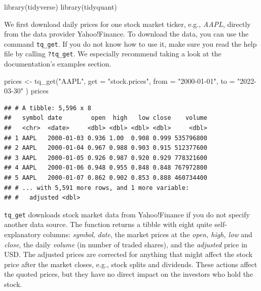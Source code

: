 \documentclass[
]{book}
\newenvironment{Shaded}{\begin{snugshade}}{\end{snugshade}}
\newcommand{\AttributeTok}[1]{\textcolor[rgb]{0.61,0.61,0.61}{#1}}
\newcommand{\FunctionTok}[1]{\textcolor[rgb]{0,0,0}{#1}}
\newcommand{\NormalTok}[1]{#1}
\newcommand{\OtherTok}[1]{\textcolor[rgb]{0.37,0.37,0.37}{#1}}
\newcommand{\StringTok}[1]{\textcolor[rgb]{0.5,0.5,0.5}{#1}}
\begin{document}
\begin{Shaded}
\begin{Highlighting}[]
\FunctionTok{library}\NormalTok{(tidyverse)}
\FunctionTok{library}\NormalTok{(tidyquant)}
\end{Highlighting}
\end{Shaded}

We first download daily prices for one stock market ticker, e.g., \emph{AAPL}, directly from the data provider Yahoo!Finance.
To download the data, you can use the command \texttt{tq\_get}. If you do not know how to use it, make sure you read the help file by calling \texttt{?tq\_get}.
We especially recommend taking a look at the documentation's examples section.

\begin{Shaded}
\begin{Highlighting}[]
\NormalTok{prices }\OtherTok{\textless{}{-}} \FunctionTok{tq\_get}\NormalTok{(}\StringTok{"AAPL"}\NormalTok{,}
  \AttributeTok{get =} \StringTok{"stock.prices"}\NormalTok{,}
  \AttributeTok{from =} \StringTok{"2000{-}01{-}01"}\NormalTok{,}
  \AttributeTok{to =} \StringTok{"2022{-}03{-}30"}
\NormalTok{)}
\NormalTok{prices}
\end{Highlighting}
\end{Shaded}

\begin{verbatim}
## # A tibble: 5,596 x 8
##   symbol date        open  high   low close    volume
##   <chr>  <date>     <dbl> <dbl> <dbl> <dbl>     <dbl>
## 1 AAPL   2000-01-03 0.936 1.00  0.908 0.999 535796800
## 2 AAPL   2000-01-04 0.967 0.988 0.903 0.915 512377600
## 3 AAPL   2000-01-05 0.926 0.987 0.920 0.929 778321600
## 4 AAPL   2000-01-06 0.948 0.955 0.848 0.848 767972800
## 5 AAPL   2000-01-07 0.862 0.902 0.853 0.888 460734400
## # ... with 5,591 more rows, and 1 more variable:
## #   adjusted <dbl>
\end{verbatim}

\texttt{tq\_get} downloads stock market data from Yahoo!Finance if you do not specify another data source. The function returns a tibble with eight quite self-explanatory columns: \emph{symbol}, \emph{date}, the market prices at the \emph{open, high, low} and \emph{close}, the daily \emph{volume} (in number of traded shares), and the \emph{adjusted} price in USD. The adjusted prices are corrected for anything that might affect the stock price after the market closes, e.g., stock splits and dividends. These actions affect the quoted prices, but they have no direct impact on the investors who hold the stock.
\end{document}
